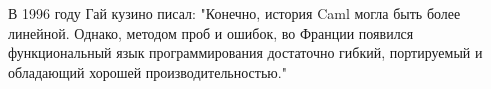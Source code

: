 \documentclass[14pt]{matmex-diploma-custom}
\begin{document}

В 1996 году Гай кузино писал: "Конечно, история Caml могла быть более линейной. Однако, методом проб и ошибок, во Франции появился функциональный язык программирования достаточно гибкий, портируемый и обладающий хорошей производительностью."
\end{document}
